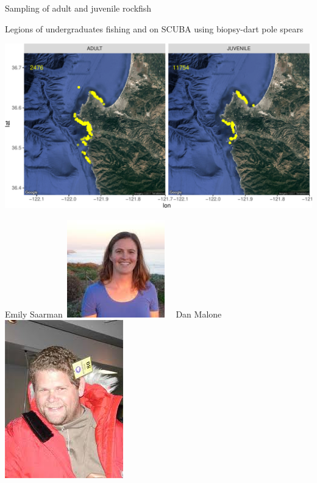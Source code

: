 \documentclass[letter,graphicx]{beamer}
\begin{document}
\begin{frame}{Sampling of adult and juvenile rockfish}

\vspace*{-8ex}
Legions of undergraduates fishing and on SCUBA using biopsy-dart pole spears
\begin{center}
\includegraphics[width=\textwidth]{figs/sampling_map1-crop.pdf}
\end{center}

\mbox{}
\vspace*{-10ex}\mbox{}
Emily Saarman~\includegraphics[height=.1\textheight]{figs/emily_saarman.jpg}
~~Dan Malone~\includegraphics[height=.1\textheight]{figs/dan_malone.jpg}

\end{frame}
\end{document}
